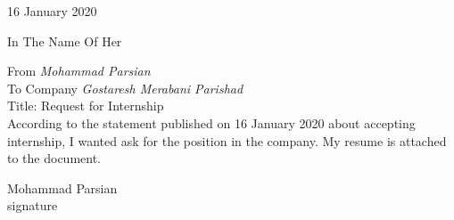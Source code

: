\documentclass[12pt, a4paper]{report}
\begin{document}
{16 January 2020} \\[0.7in]

\begin{center}
In The Name Of Her\\[0.4in]
\end{center}

\noindent
From \emph{Mohammad Parsian}\\
To Company \emph{Gostaresh Merabani Parishad}\\
Title: Request for Internship \\[0.1in]
According to the statement published on 16 January 2020 about accepting internship, I wanted ask for the position in the company. My resume is attached to the document. \\[0.4in]

\begin{flushright}
  Mohammad Parsian \\[0.2in]
  signature
\end{flushright}
\end{document}
